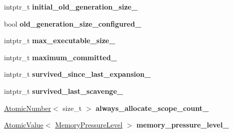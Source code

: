 \begin{DoxyCompactItemize}
\item 
intptr\+\_\+t {\bfseries initial\+\_\+old\+\_\+generation\+\_\+size\+\_\+}\hypertarget{classv8_1_1internal_1_1_heap_a0e4571b24cb7a3f5a2ee9472bb3091fc}{}\label{classv8_1_1internal_1_1_heap_a0e4571b24cb7a3f5a2ee9472bb3091fc}

\item 
bool {\bfseries old\+\_\+generation\+\_\+size\+\_\+configured\+\_\+}\hypertarget{classv8_1_1internal_1_1_heap_a7e6f80f7a8730c87789f82587cea6027}{}\label{classv8_1_1internal_1_1_heap_a7e6f80f7a8730c87789f82587cea6027}

\item 
intptr\+\_\+t {\bfseries max\+\_\+executable\+\_\+size\+\_\+}\hypertarget{classv8_1_1internal_1_1_heap_a3f6f5f4ac680c84296921060dd889e0d}{}\label{classv8_1_1internal_1_1_heap_a3f6f5f4ac680c84296921060dd889e0d}

\item 
intptr\+\_\+t {\bfseries maximum\+\_\+committed\+\_\+}\hypertarget{classv8_1_1internal_1_1_heap_a97d49791602a4fde864951b600376ede}{}\label{classv8_1_1internal_1_1_heap_a97d49791602a4fde864951b600376ede}

\item 
intptr\+\_\+t {\bfseries survived\+\_\+since\+\_\+last\+\_\+expansion\+\_\+}\hypertarget{classv8_1_1internal_1_1_heap_a27c3551b7e3e55e16fe64aa36a3778f0}{}\label{classv8_1_1internal_1_1_heap_a27c3551b7e3e55e16fe64aa36a3778f0}

\item 
intptr\+\_\+t {\bfseries survived\+\_\+last\+\_\+scavenge\+\_\+}\hypertarget{classv8_1_1internal_1_1_heap_af8301ba05f9c545c9177ac6d5bf1761e}{}\label{classv8_1_1internal_1_1_heap_af8301ba05f9c545c9177ac6d5bf1761e}

\item 
\hyperlink{classv8_1_1internal_1_1_atomic_number}{Atomic\+Number}$<$ size\+\_\+t $>$ {\bfseries always\+\_\+allocate\+\_\+scope\+\_\+count\+\_\+}\hypertarget{classv8_1_1internal_1_1_heap_af9a1df8623096217a58ae1bcd2d314cb}{}\label{classv8_1_1internal_1_1_heap_af9a1df8623096217a58ae1bcd2d314cb}

\item 
\hyperlink{classv8_1_1internal_1_1_atomic_value}{Atomic\+Value}$<$ \hyperlink{namespacev8_ae0e9a25bf51e518585f555806e7dc7b9}{Memory\+Pressure\+Level} $>$ {\bfseries memory\+\_\+pressure\+\_\+level\+\_\+}\hypertarget{classv8_1_1internal_1_1_heap_abd6fad418e4885fe96920979be83a021}{}\label{classv8_1_1internal_1_1_heap_abd6fad418e4885fe96920979be83a021}


\end{DoxyCompactItemize}
